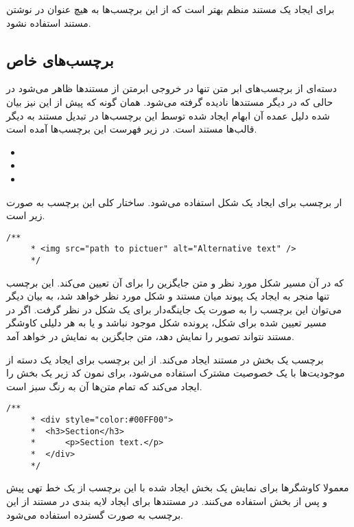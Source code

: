 \begin{note}
 برای ایجاد یک مستند منظم بهتر است که از این برچسب‌ها به هیچ عنوان در نوشتن مستند استفاده نشود.
\end{note}

\subsection{برچسب‌های خاص}
دسته‌ای از برچسب‌های ابر متن تنها در خروجی ابرمتن از مستند‌ها ظاهر می‌شود  در حالی که در دیگر مستند‌ها نادیده گرفته می‌شود.
همان گونه که پیش از این نیز بیان شده دلیل عمده آن ابهام ایجاد شده توسط این برچسب‌ها در تبدیل مستند به دیگر قالب‌ها مستند است.
در زیر فهرست این برچسب‌ها آمده است.
\begin{itemize}
 \item {}
 \item {}
 \item {}
\end{itemize}
ار برچسب  برای ایجاد یک شکل استفاده می‌شود. ساختار کلی این برچسب به صورت زیر است.
\begin{latin}
\lstset{language=C++}  
\begin{lstlisting}[frame=single] 
    /**
     * <img src="path to pictuer" alt="Alternative text" />
     */
\end{lstlisting}
\end{latin}
که در آن  مسیر شکل مورد نظر و  متن جایگزین را برای آن تعیین می‌کند. این برچسب تنها
منجر به ایجاد یک پیوند میان مستند و شکل مورد نظر خواهد شد، به بیان دیگر می‌توان این برچسب را به صورت
یک جاینگه‌دار برای یک شکل در نظر گرفت. اگر در مسیر تعیین شده برای شکل، پرونده شکل موجود نباشد و یا
به هر دلیلی کاوشگر مستند نتواند تصویر را نمایش دهد، متن جایگزین به نمایش در خواهد آمد.

برچسب  یک بخش در مستند ایجاد می‌کند.  از این برچسب برای ایجاد یک دسته از موجودیت‌ها با یک
خصوصیت مشترک استفاده می‌شود، برای نمون کد زیر یک بخش را ایجاد می‌کند که تمام متن‌ها آن به رنگ سبز
است.
\begin{latin}
\lstset{language=C++}  
\begin{lstlisting}[frame=single] 
    /**
     * <div style="color:#00FF00">
     * 	<h3>Section</h3>
     * 		<p>Section text.</p>
     * 	</div>
     */
\end{lstlisting}
\end{latin}
معمولا کاوشگرها برای نمایش یک بخش ایجاد شده با این برچسب از یک خط تهی پیش و پس از بخش 
استفاده می‌کنند. در مستندها برای ایجاد لایه بندی در مستند از این برچسب به صورت گسترده استفاده
می‌شود.

